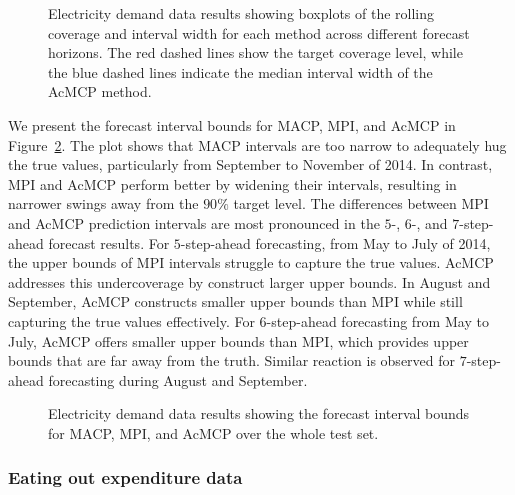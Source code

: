 \documentclass[
  11pt,
  a4paper,
]{article}
\theoremstyle{plain}
\theoremstyle{remark}
\begin{document}
\begin{figure}


\caption{\label{fig-elec_box}Electricity demand data results showing
boxplots of the rolling coverage and interval width for each method
across different forecast horizons. The red dashed lines show the target
coverage level, while the blue dashed lines indicate the median interval
width of the AcMCP method.}

\end{figure}%

We present the forecast interval bounds for MACP, MPI, and AcMCP in
Figure~\ref{fig-elec_timeplot}. The plot shows that MACP intervals are
too narrow to adequately hug the true values, particularly from
September to November of 2014. In contrast, MPI and AcMCP perform better
by widening their intervals, resulting in narrower swings away from the
\(90\%\) target level. The differences between MPI and AcMCP prediction
intervals are most pronounced in the \(5\)-, \(6\)-, and
\(7\)-step-ahead forecast results. For \(5\)-step-ahead forecasting,
from May to July of 2014, the upper bounds of MPI intervals struggle to
capture the true values. AcMCP addresses this undercoverage by construct
larger upper bounds. In August and September, AcMCP constructs smaller
upper bounds than MPI while still capturing the true values effectively.
For \(6\)-step-ahead forecasting from May to July, AcMCP offers smaller
upper bounds than MPI, which provides upper bounds that are far away
from the truth. Similar reaction is observed for \(7\)-step-ahead
forecasting during August and September.

\begin{figure}


\caption{\label{fig-elec_timeplot}Electricity demand data results
showing the forecast interval bounds for MACP, MPI, and AcMCP over the
whole test set.}

\end{figure}%

\subsubsection{Eating out expenditure
data}\label{eating-out-expenditure-data}
\end{document}
